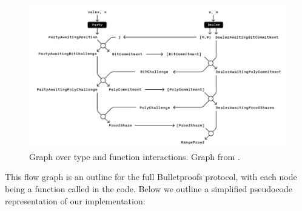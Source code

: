 \documentclass{article}
\begin{document}
\newpage

\begin{figure}[H]
	\centering
	\includegraphics[scale=0.4]{img/multi-party protocol.png}
	\caption{
		Graph over type and function interactions. Graph from
		\cite{dalek-notes}.
	}
	\label{implementation-graph}
\end{figure}

This flow graph is an outline for the full Bulletproofs protocol,
with each node being a function called in the code. Below we outline
a simplified pseudocode representation of our implementation:
\end{document}
